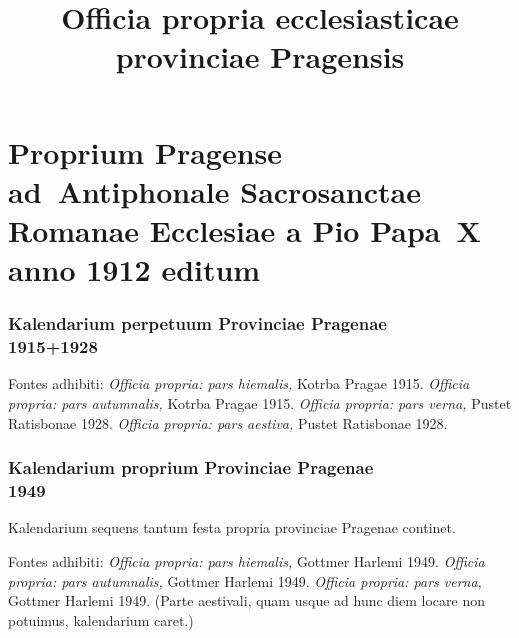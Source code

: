 \documentclass[12pt, a5paper, twoside]{book}
\title{Officia propria ecclesiasticae provinciae Pragensis}
\begin{document}
\pagestyle{empty}

\setlength{\parindent}{0.5cm}

\maketitle

\cleardoublepage

\pagestyle{plain}



\part{Proprium Pragense ad~Antiphonale Sacrosanctae Romanae Ecclesiae
  a Pio Papa~X anno 1912 editum}

\section*{Kalendarium perpetuum Provinciae Pragenae\\1915+1928}

{\footnotesize
  Fontes adhibiti:
  \emph{Officia propria: pars hiemalis,} Kotrba Pragae 1915.
  \emph{Officia propria: pars autumnalis,} Kotrba Pragae 1915.
  \emph{Officia propria: pars verna,} Pustet Ratisbonae 1928.
  \emph{Officia propria: pars aestiva,} Pustet Ratisbonae 1928.
}


\cleardoublepage

\section*{Kalendarium proprium Provinciae Pragenae\\1949}

{\footnotesize
  Kalendarium sequens tantum festa propria provinciae Pragenae
  continet.

  Fontes adhibiti:
  \emph{Officia propria: pars hiemalis,} Gottmer Harlemi 1949.
  \emph{Officia propria: pars autumnalis,} Gottmer Harlemi 1949.
  \emph{Officia propria: pars verna,} Gottmer Harlemi 1949.
  (Parte aestivali, quam usque ad hunc diem locare non potuimus,
  kalendarium caret.)
}


\cleardoublepage











\end{document}
